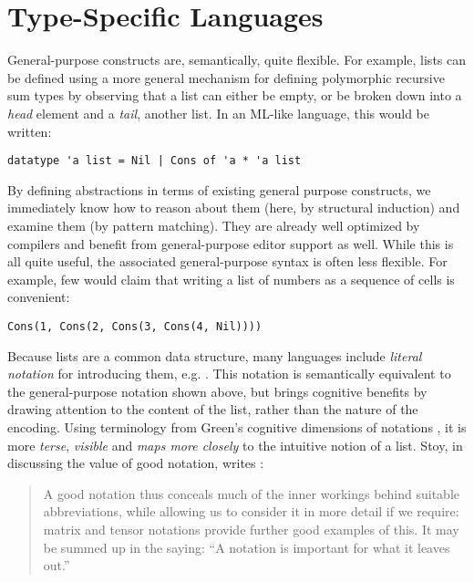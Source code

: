 \section{Type-Specific Languages}\label{aparsing}
General-purpose constructs are, semantically, quite flexible. 
For example, lists can be defined using a more general mechanism for defining polymorphic recursive sum types by observing that a list can either be empty, or be broken down into a \emph{head} element and a \emph{tail}, another list. In an ML-like language, this would be written:
\begin{lstlisting}[numbers=none]
datatype 'a list = Nil | Cons of 'a * 'a list
\end{lstlisting}
By defining abstractions in terms of existing general purpose constructs, we immediately know how to reason about them (here, by structural induction) and examine them (by pattern matching). They are already well optimized by compilers and benefit from general-purpose editor support as well. %
While this is all quite useful, the associated general-purpose syntax is often less flexible. For example, few would claim that writing a list of numbers as a sequence of  cells is convenient:
\begin{lstlisting}[numbers=none]
Cons(1, Cons(2, Cons(3, Cons(4, Nil))))
\end{lstlisting}

Because lists are a common data structure, many languages include \emph{literal notation} for introducing them, e.g. \li{[1, 2, 3, 4]}. This notation is semantically equivalent to the general-purpose notation shown above, but brings cognitive benefits by drawing attention to the content of the list, rather than the nature of the encoding. Using terminology from Green's cognitive dimensions of notations \cite{green1996usability}, it is more \emph{terse}, \emph{visible} and \emph{maps more closely} to the intuitive notion of a list. Stoy, in discussing the value of good notation, writes \cite{stoy1977denotational}:
\begin{quote}A good notation thus conceals much of the inner workings behind suitable abbreviations, while allowing us to consider it in more detail if we require: matrix and tensor notations provide further good examples of this. It may be summed up in the saying: ``A notation is important for what it leaves out.''\end{quote}

